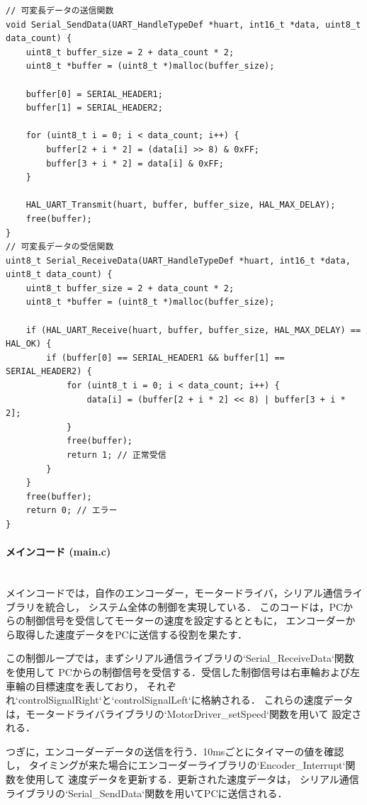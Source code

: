 \newpage
\lstset{language=C, caption=可変長データの送受信関数 (serial\_lib.c)}

\begin{lstlisting}
// 可変長データの送信関数
void Serial_SendData(UART_HandleTypeDef *huart, int16_t *data, uint8_t data_count) {
    uint8_t buffer_size = 2 + data_count * 2;
    uint8_t *buffer = (uint8_t *)malloc(buffer_size);

    buffer[0] = SERIAL_HEADER1;
    buffer[1] = SERIAL_HEADER2;

    for (uint8_t i = 0; i < data_count; i++) {
        buffer[2 + i * 2] = (data[i] >> 8) & 0xFF;
        buffer[3 + i * 2] = data[i] & 0xFF;
    }

    HAL_UART_Transmit(huart, buffer, buffer_size, HAL_MAX_DELAY);
    free(buffer);
}
// 可変長データの受信関数
uint8_t Serial_ReceiveData(UART_HandleTypeDef *huart, int16_t *data, uint8_t data_count) {
    uint8_t buffer_size = 2 + data_count * 2;
    uint8_t *buffer = (uint8_t *)malloc(buffer_size);

    if (HAL_UART_Receive(huart, buffer, buffer_size, HAL_MAX_DELAY) == HAL_OK) {
        if (buffer[0] == SERIAL_HEADER1 && buffer[1] == SERIAL_HEADER2) {
            for (uint8_t i = 0; i < data_count; i++) {
                data[i] = (buffer[2 + i * 2] << 8) | buffer[3 + i * 2];
            }
            free(buffer);
            return 1; // 正常受信
        }
    }
    free(buffer);
    return 0; // エラー
}
\end{lstlisting}
\newpage

\paragraph{メインコード (main.c)}\mbox{}\\
メインコードでは，自作のエンコーダー，モータードライバ，シリアル通信ライブラリを統合し，
システム全体の制御を実現している．
このコードは，PCからの制御信号を受信してモーターの速度を設定するとともに，
エンコーダーから取得した速度データをPCに送信する役割を果たす．

この制御ループでは，まずシリアル通信ライブラリの`Serial\_ReceiveData`関数を使用して
PCからの制御信号を受信する．受信した制御信号は右車輪および左車輪の目標速度を表しており，
それぞれ`controlSignalRight`と`controlSignalLeft`に格納される．
これらの速度データは，モータードライバライブラリの`MotorDriver\_setSpeed`関数を用いて
設定される．

つぎに，エンコーダーデータの送信を行う．10msごとにタイマーの値を確認し，
タイミングが来た場合にエンコーダーライブラリの`Encoder\_Interrupt`関数を使用して
速度データを更新する．更新された速度データは，
シリアル通信ライブラリの`Serial\_SendData`関数を用いてPCに送信される．

